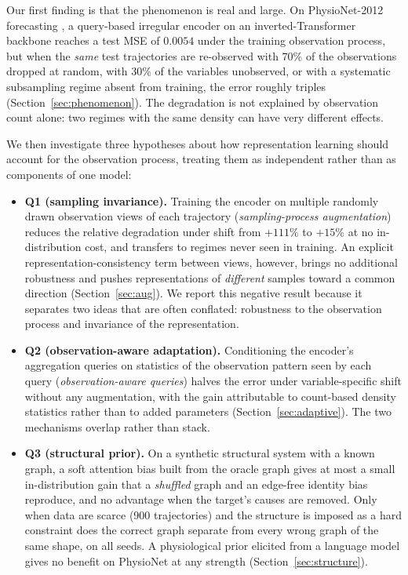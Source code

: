 \documentclass[sigconf,nonacm]{acmart}
\begin{document}
Our first finding is that the phenomenon is real and large. On PhysioNet-2012 forecasting
\cite{silva2012physionet}, a query-based irregular encoder on an inverted-Transformer backbone reaches a test MSE
of $0.0054$ under the training observation process, but when the \emph{same} test trajectories are re-observed with
70\% of the observations dropped at random, with 30\% of the variables unobserved, or with a systematic
subsampling regime absent from training, the error roughly triples (Section~\ref{sec:phenomenon}). The degradation
is not explained by observation count alone: two regimes with the same density can have very different effects.

We then investigate three hypotheses about how representation learning should account for the observation
process, treating them as independent rather than as components of one model:

\begin{itemize}
\item \textbf{Q1 (sampling invariance).} Training the encoder on multiple randomly drawn observation views of each
trajectory (\emph{sampling-process augmentation}) reduces the relative degradation under shift from $+111\%$ to
$+15\%$ at no in-distribution cost, and transfers to regimes never seen in training. An explicit
representation-consistency term between views, however, brings no additional robustness and pushes
representations of \emph{different} samples toward a common direction (Section~\ref{sec:aug}). We report this
negative result because it separates two ideas that are often conflated: robustness to the observation process
and invariance of the representation.
\item \textbf{Q2 (observation-aware adaptation).} Conditioning the encoder's aggregation queries on statistics of
the observation pattern seen by each query (\emph{observation-aware queries}) halves the error under
variable-specific shift without any augmentation, with the gain attributable to count-based density statistics
rather than to added parameters (Section~\ref{sec:adaptive}). The two mechanisms overlap rather than stack.
\item \textbf{Q3 (structural prior).} On a synthetic structural system with a known graph, a soft attention
bias built from the oracle graph gives at most a small in-distribution gain that a \emph{shuffled} graph and an
edge-free identity bias reproduce, and no advantage when the target's causes are removed. Only when data are
scarce (900 trajectories) and the structure is imposed as a hard constraint does the correct graph separate from
every wrong graph of the same shape, on all seeds. A physiological prior elicited from a language model gives no
benefit on PhysioNet at any strength (Section~\ref{sec:structure}).
\end{itemize}
\end{document}
